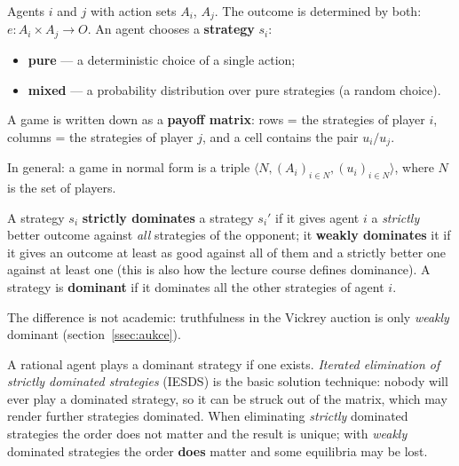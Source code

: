 \documentclass[11pt,a4paper]{article}
\theoremstyle{definition}
\begin{document}
\begin{defbox}
Agents $i$ and $j$ with action sets $A_i$, $A_j$. The outcome is determined by both:
$e : A_i \times A_j \to O$. An agent chooses a \textbf{strategy} $s_i$:
\begin{itemize}
\item \textbf{pure} --- a deterministic choice of a single action;
\item \textbf{mixed} --- a probability distribution over pure strategies (a random choice).
\end{itemize}
A game is written down as a \textbf{payoff matrix}: rows = the strategies of player $i$,
columns = the strategies of player $j$, and a cell contains the pair $u_i / u_j$.

In general: a game in normal form is a triple $\langle N, (A_i)_{i \in N}, (u_i)_{i \in N}\rangle$,
where $N$ is the set of players.
\end{defbox}

\begin{defbox}[Dominance]
A strategy $s_i$ \textbf{strictly dominates} a strategy $s_i'$ if it gives agent $i$ a
\emph{strictly} better outcome against \emph{all} strategies of the opponent;
it \textbf{weakly dominates} it if it gives an outcome at least as good against all of them and a
strictly better one against at least one (this is also how the lecture course defines dominance). A
strategy is \textbf{dominant} if it dominates all the other strategies of agent $i$.

The difference is not academic: truthfulness in the Vickrey auction is only \emph{weakly} dominant
(section~\ref{ssec:aukce}).

A rational agent plays a dominant strategy if one exists. \emph{Iterated elimination of strictly
dominated strategies} (IESDS) is the basic solution technique: nobody will ever play a dominated
strategy, so it can be struck out of the matrix, which may render further strategies dominated.
When eliminating \emph{strictly} dominated strategies the order does not matter and the result is
unique; with \emph{weakly} dominated strategies the order \textbf{does} matter and some equilibria may
be lost.
\end{defbox}
\end{document}
